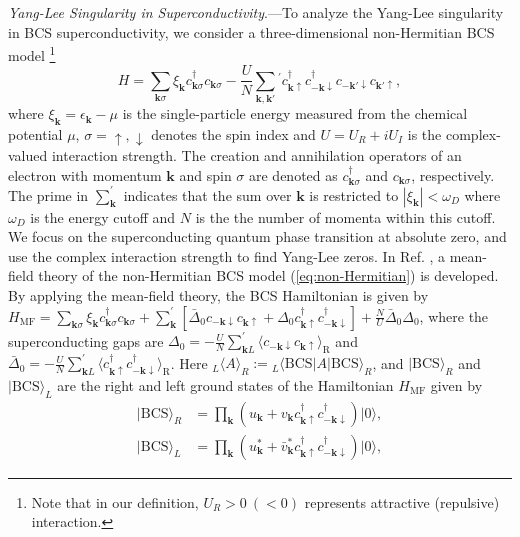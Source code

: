\documentclass[aps,prl,twocolumn,nofootinbib,superscriptaddress,longbibliography]{revtex4-1}
\begin{document}
	\emph{Yang-Lee Singularity in Superconductivity}.---To analyze the Yang-Lee singularity in BCS superconductivity, we consider a three-dimensional non-Hermitian BCS model \cite{Yamamoto2019}\footnote{Note that in our definition, $U_{R}>0\:(<0)$ represents attractive (repulsive) interaction.} 
	\begin{equation}
	H=\sum_{\boldsymbol{k}\sigma}\xi_{\boldsymbol{k}}c_{\boldsymbol{k}\sigma}^{\dagger}c_{\boldsymbol{k}\sigma}-\frac{U}{N}\sum_{\bm{k},\bm{k}'}{}^{'}c_{\bm{k}\uparrow}^{\dagger}c_{\bm{-k}\downarrow}^{\dagger}c_{\bm{-k}'\downarrow}c_{\bm{k}'\uparrow},\label{eq:non-Hermitian}
	\end{equation}
	where $\xi_{\boldsymbol{k}}=\epsilon_{\bm{k}}-\mu$ is the single-particle energy measured from the chemical potential $\mu$, $\sigma=\uparrow,\downarrow$ denotes the spin index and $U=U_R+iU_I$ is the complex-valued interaction  strength. The creation and annihilation operators of an electron with momentum $\bm{k}$ and spin $\sigma$ are denoted as $c_{\bm{k}\sigma}^\dag$ and $c_{\bm{k}\sigma}$, respectively. The prime in $\sum_{\bm{k}}^{'}$ indicates that the sum over $\bm{k}$ is restricted to  $|\xi_{\boldsymbol{k}}|<\omega_D$ where $\omega_D$ is the energy cutoff and $N$ is the the number of momenta within this cutoff. We focus on the superconducting quantum phase transition at absolute zero, and use the complex interaction strength to find Yang-Lee zeros. In Ref. \cite{Yamamoto2019}, a mean-field theory of the non-Hermitian BCS model (\ref{eq:non-Hermitian}) is developed. %
	By applying the mean-field theory, the BCS Hamiltonian is given by $H_{\mathrm{MF}}=\sum_{\boldsymbol{k}\sigma}\xi_{\boldsymbol{k}}c_{\boldsymbol{k}\sigma}^{\dagger}c_{\boldsymbol{k}\sigma}+\sum_{\bm{k}}^{'}[\bar{\Delta}_0c_{-\bm{k}\downarrow}c_{\bm{k}\uparrow}+\Delta_0 c_{\bm{k}\uparrow}^{\dagger}c_{-\bm{k}\downarrow}^{\dagger}]+\frac{N}{U}\bar{\Delta}_0\Delta_0$, where the superconducting gaps are $\Delta_{0}=-\frac{U}{N}\sum_{\boldsymbol{k}L}^{'}\langle c_{-\boldsymbol{k}\downarrow}c_{\boldsymbol{k}\uparrow}\rangle_{\mathrm{R}}$ and $\bar{\Delta}_{0}=-\frac{U}{N}\sum_{\boldsymbol{k}L}^{'}\langle c_{\boldsymbol{k}\uparrow}^{\dagger}c_{-\boldsymbol{k}\downarrow}^{\dagger}\rangle_{\mathrm{R}}$. Here ${}_L\langle A\rangle_{R}:={}_L\langle \text{BCS}|A|\text{BCS}\rangle_R$, and $|\text{BCS}\rangle_{R}$ and $|\text{BCS}\rangle_{L}$ are the right and left ground states of the Hamiltonian $H_{\mathrm{MF}}$ given by \cite{Yamamoto2019}
	\begin{align}
		|\text{BCS}\rangle_{R}&=\prod_{\bm{k}}(u_{\bm{k}}+v_{\bm{k}}c_{\boldsymbol{k}\uparrow}^{\dagger}c_{-\boldsymbol{k}\downarrow}^{\dagger})|0\rangle,\\
		|\text{BCS}\rangle_{L}&=\prod_{\bm{k}}(u^{*}_{\bm{k}}+\bar{v}^{*}_{\bm{k}}c_{\boldsymbol{k}\uparrow}^{\dagger}c_{-\boldsymbol{k}\downarrow}^{\dagger})|0\rangle,
	\end{align}
\end{document}
